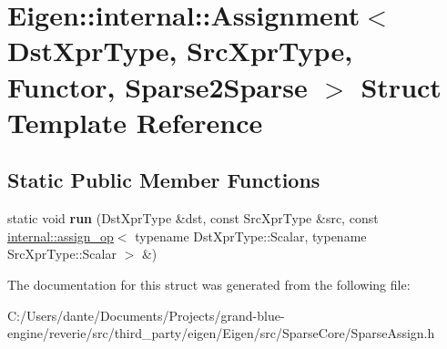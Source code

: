 \hypertarget{struct_eigen_1_1internal_1_1_assignment_3_01_dst_xpr_type_00_01_src_xpr_type_00_01_functor_00_01_sparse2_sparse_01_4}{}\section{Eigen\+::internal\+::Assignment$<$ Dst\+Xpr\+Type, Src\+Xpr\+Type, Functor, Sparse2\+Sparse $>$ Struct Template Reference}
\label{struct_eigen_1_1internal_1_1_assignment_3_01_dst_xpr_type_00_01_src_xpr_type_00_01_functor_00_01_sparse2_sparse_01_4}
\subsection*{Static Public Member Functions}
\begin{DoxyCompactItemize}
\item 
\mbox{\label{struct_eigen_1_1internal_1_1_assignment_3_01_dst_xpr_type_00_01_src_xpr_type_00_01_functor_00_01_sparse2_sparse_01_4_a6611277406152002f37cb9c1e06eb463}} 
static void {\bfseries run} (Dst\+Xpr\+Type \&dst, const Src\+Xpr\+Type \&src, const \mbox{\hyperlink{struct_eigen_1_1internal_1_1assign__op}{internal\+::assign\+\_\+op}}$<$ typename Dst\+Xpr\+Type\+::\+Scalar, typename Src\+Xpr\+Type\+::\+Scalar $>$ \&)
\end{DoxyCompactItemize}


The documentation for this struct was generated from the following file\+:\begin{DoxyCompactItemize}
\item 
C\+:/\+Users/dante/\+Documents/\+Projects/grand-\/blue-\/engine/reverie/src/third\+\_\+party/eigen/\+Eigen/src/\+Sparse\+Core/Sparse\+Assign.\+h\end{DoxyCompactItemize}
